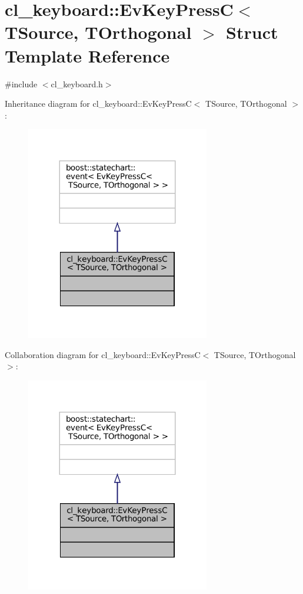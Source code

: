 \hypertarget{structcl__keyboard_1_1EvKeyPressC}{}\section{cl\+\_\+keyboard\+:\+:Ev\+Key\+PressC$<$ T\+Source, T\+Orthogonal $>$ Struct Template Reference}
\label{structcl__keyboard_1_1EvKeyPressC}


{\ttfamily \#include $<$cl\+\_\+keyboard.\+h$>$}



Inheritance diagram for cl\+\_\+keyboard\+:\+:Ev\+Key\+PressC$<$ T\+Source, T\+Orthogonal $>$\+:
\nopagebreak
\begin{figure}[H]
\begin{center}
\leavevmode
\includegraphics[width=227pt]{structcl__keyboard_1_1EvKeyPressC__inherit__graph}
\end{center}
\end{figure}


Collaboration diagram for cl\+\_\+keyboard\+:\+:Ev\+Key\+PressC$<$ T\+Source, T\+Orthogonal $>$\+:
\nopagebreak
\begin{figure}[H]
\begin{center}
\leavevmode
\includegraphics[width=227pt]{structcl__keyboard_1_1EvKeyPressC__coll__graph}
\end{center}
\end{figure}


